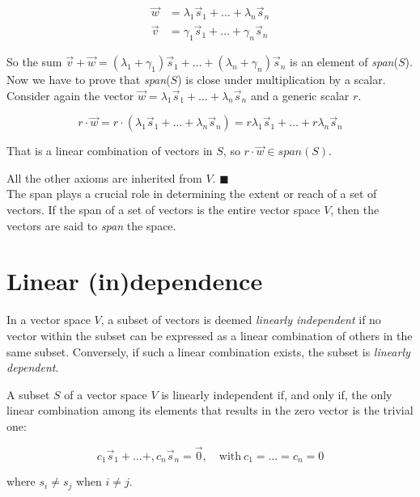 \begin{align*}
\vec w &= \lambda_1 \vec s_1 + \dots + \lambda_n \vec s_n\\
\vec v &= \gamma_{1} \vec s_1 + \dots + \gamma_{n} \vec s_n
\end{align*}

So the sum $\vec v + \vec w = (\lambda_1 + \gamma_1) \vec s_1 + \dots + (\lambda_n + \gamma_n) \vec s_n$ is an element of \textit{span}($S$).
\\

Now we have to prove that \textit{span}($S$) is close under multiplication by a scalar.
\\

Consider again the vector $\vec w = \lambda_1 \vec s_1 + \dots + \lambda_n \vec s_n$ and a generic scalar $r$.

$$
r \cdot \vec w = r \cdot (\lambda_1 \vec s_1 + \dots + \lambda_n \vec s_n) = r\lambda_1 \vec s_1 + \dots + r\lambda_n \vec s_n
$$

That is a linear combination of vectors in $S$, so $r \cdot \vec w \in \textit{span}(S)$.

All the other axioms are inherited from $V$. $\blacksquare$
\\

The span plays a crucial role in determining the extent or reach of a set of vectors. If the span of a set of vectors is the entire vector space $V$, then the vectors are said to \emph{span} the space.
\section{Linear (in)dependence}

    In a vector space $V$, a subset of vectors is deemed \emph{linearly independent} if no vector within the subset can be expressed as a linear combination of others in the same subset. Conversely, if such a linear combination exists, the subset is \emph{linearly dependent}.

\begin{lemma}
   A subset $S$ of a vector space $V$ is linearly independent if, and only if, the only linear combination among its elements that results in the zero vector is the trivial one:

   $$
   c_1 \vec s_1 + \dots +, c_n \vec s_n = \vec 0, \quad \text{with} \ c_1 = \dots = c_n = 0 
   $$

where $s_i \neq s_j$ when $i \neq j$.
\end{lemma}


